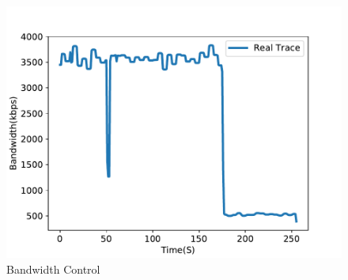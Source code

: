 \begin{figure}[htb]
\centering
\includegraphics[width=.8\columnwidth]{fig/case_study_bandwidth.pdf}
\caption{Bandwidth Control}
\label{fig:case-bandwidth}
\end{figure} 

